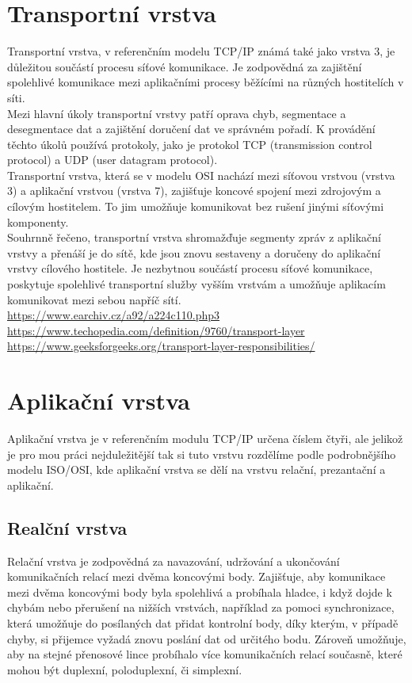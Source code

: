 \documentclass[12pt]{report}			%
\begin{document}
			\section{Transportní vrstva}
Transportní vrstva, v referenčním modelu TCP/IP známá také jako vrstva 3, je důležitou součástí procesu síťové komunikace. Je zodpovědná za zajištění spolehlivé komunikace mezi aplikačními procesy běžícími na různých hostitelích v síti.
\\
Mezi hlavní úkoly transportní vrstvy patří oprava chyb, segmentace a desegmentace dat a zajištění doručení dat ve správném pořadí. K provádění těchto úkolů používá protokoly, jako je protokol TCP (transmission control protocol) a UDP (user datagram protocol).
\\
Transportní vrstva, která se v modelu OSI nachází mezi síťovou vrstvou (vrstva 3) a aplikační vrstvou (vrstva 7), zajišťuje koncové spojení mezi zdrojovým a cílovým hostitelem. To jim umožňuje komunikovat bez rušení jinými síťovými komponenty.
\\
Souhrnně řečeno, transportní vrstva shromažďuje segmenty zpráv z aplikační vrstvy a přenáší je do sítě, kde jsou znovu sestaveny a doručeny do aplikační vrstvy cílového hostitele. Je nezbytnou součástí procesu síťové komunikace, poskytuje spolehlivé transportní služby vyšším vrstvám a umožňuje aplikacím komunikovat mezi sebou napříč sítí.
\\
\url{https://www.earchiv.cz/a92/a224c110.php3}
\url{https://www.techopedia.com/definition/9760/transport-layer}
\url{https://www.geeksforgeeks.org/transport-layer-responsibilities/}
			\section{Aplikační  vrstva}
 Aplikační vrstva je v referenčním modulu TCP/IP určena číslem čtyři, ale jelikož je pro mou práci nejduležitější tak si tuto vrstvu rozdělíme podle podrobnějšího modelu ISO/OSI, kde aplikační vrstva se dělí na vrstvu relační, prezantační a aplikační. 
				\subsection{Realční vrstva}
Relační vrstva je zodpovědná za navazování, udržování a ukončování komunikačních relací mezi dvěma koncovými body. Zajišťuje, aby komunikace mezi dvěma koncovými body byla spolehlivá a probíhala hladce, i když dojde k chybám nebo přerušení na nižších vrstvách, například za pomoci synchronizace, která umožňuje do posílaných dat přidat kontrolní body, díky kterým, v případě chyby, si přijemce vyžadá znovu poslání dat od určitého bodu. Zároveň umožňuje, aby na stejné přenosové lince probíhalo více komunikačních relací současně, které mohou být duplexní, poloduplexní, či simplexní. 
\end{document}
